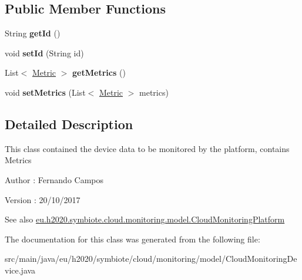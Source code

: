 \subsection*{Public Member Functions}
\begin{DoxyCompactItemize}
\item 
\mbox{\label{classeu_1_1h2020_1_1symbiote_1_1cloud_1_1monitoring_1_1model_1_1CloudMonitoringDevice_adbc8469e5825d3f9f1a8268cc001a5f8}} 
String {\bfseries get\+Id} ()
\item 
\mbox{\label{classeu_1_1h2020_1_1symbiote_1_1cloud_1_1monitoring_1_1model_1_1CloudMonitoringDevice_a524322f72852fd82d3b15a84ee31b0cb}} 
void {\bfseries set\+Id} (String id)
\item 
\mbox{\label{classeu_1_1h2020_1_1symbiote_1_1cloud_1_1monitoring_1_1model_1_1CloudMonitoringDevice_a3cb7e41e8d862187d97b4a4c89d95f37}} 
List$<$ \hyperlink{classeu_1_1h2020_1_1symbiote_1_1cloud_1_1monitoring_1_1model_1_1Metric}{Metric} $>$ {\bfseries get\+Metrics} ()
\item 
\mbox{\label{classeu_1_1h2020_1_1symbiote_1_1cloud_1_1monitoring_1_1model_1_1CloudMonitoringDevice_a25ef4e7648007c61bbbe57daf2de8749}} 
void {\bfseries set\+Metrics} (List$<$ \hyperlink{classeu_1_1h2020_1_1symbiote_1_1cloud_1_1monitoring_1_1model_1_1Metric}{Metric} $>$ metrics)
\end{DoxyCompactItemize}


\subsection{Detailed Description}
This class contained the device data to be monitored by the platform, contains Metrics

\begin{DoxyAuthor}{Author}
\+: Fernando Campos 
\end{DoxyAuthor}
\begin{DoxyVersion}{Version}
\+: 20/10/2017
\end{DoxyVersion}
\begin{DoxySeeAlso}{See also}
\hyperlink{classeu_1_1h2020_1_1symbiote_1_1cloud_1_1monitoring_1_1model_1_1CloudMonitoringPlatform}{eu.\+h2020.\+symbiote.\+cloud.\+monitoring.\+model.\+Cloud\+Monitoring\+Platform} 
\end{DoxySeeAlso}


The documentation for this class was generated from the following file\+:\begin{DoxyCompactItemize}
\item 
src/main/java/eu/h2020/symbiote/cloud/monitoring/model/Cloud\+Monitoring\+Device.\+java\end{DoxyCompactItemize}
